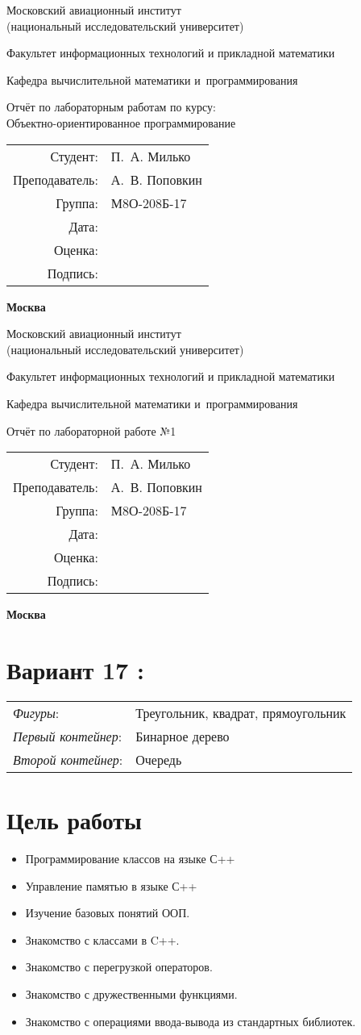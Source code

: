 \documentclass[12pt]{article}
\newcommand{\ttitle}[1]{
    \newpage
        \begin{center}
            \bfseries
            
            {\Large Московский авиационный институт\\ (национальный исследовательский университет)
                
            }
            
            \vspace{48pt}
            
            {\large Факультет информационных технологий и прикладной математики
            }
            
            \vspace{36pt}
            
            
            {\large Кафедра вычислительной математики и~программирования
                
            }
            
            
            \vspace{48pt}
            
            Отчёт по лабораторной работе №#1
        
        \end{center}

        \vspace{72pt}

    \begin{flushright}
        \begin{tabular}{rl}
            Студент: & П.\, А. Милько \\
            Преподаватель: & А.\, В. Поповкин \\
            Группа: & М8О-208Б-17 \\
            Дата: & \\
            Оценка: & \\
            Подпись: & \\
        \end{tabular}
    \end{flushright}
    
    \vfill
    
    \begin{center}
        \bfseries
        Москва\\
        \the\year
    \end{center}
    
\pagebreak
}
\newcommand{\se}[1]{\section*{#1}}
\newcommand{\var}{\se{Вариант
    \textbf{\large {17 :}}}
\noindent     \begin{tabular}{ll}
    \textit{Фигуры}: &Треугольник, квадрат, прямоугольник\\
    \textit{Первый контейнер}: &Бинарное дерево \\
    \textit{Второй контейнер}: &Очередь    
    \end{tabular}

}
\begin{document}
\begin{center}
	\bfseries

	{\Large Московский авиационный институт\\ (национальный исследовательский университет)

	}

	\vspace{48pt}

	{\large Факультет информационных технологий и прикладной математики
	}

	\vspace{36pt}


	{\large Кафедра вычислительной математики и~программирования

	}


	\vspace{48pt}

	{Отчёт по лабораторным работам по курсу: \\
		Объектно-ориентированное программирование}

\end{center}

\vspace{72pt}

\begin{flushright}
	\begin{tabular}{rl}
		Студент:       & П.\, А. Милько   \\
		Преподаватель: & А.\, В. Поповкин \\
		Группа:        & М8О-208Б-17      \\
		Дата:          &                  \\
		Оценка:        &                  \\
		Подпись:       &                  \\
	\end{tabular}
\end{flushright}

\vfill

\begin{center}
	\bfseries
	Москва\\
	\the\year
\end{center}

\ttitle{1}
\fancyfoot[C]{\thepage}
\var
\se{Цель работы}
\begin{itemize}
	\item  Программирование классов на языке С++
	\item     Управление памятью в языке С++
	\item     Изучение базовых понятий ООП.
	\item Знакомство с классами в C++.
	\item     Знакомство с перегрузкой операторов.
	\item     Знакомство с дружественными функциями.
	\item     Знакомство с операциями ввода-вывода из стандартных библиотек.
\end{itemize}
\end{document}
